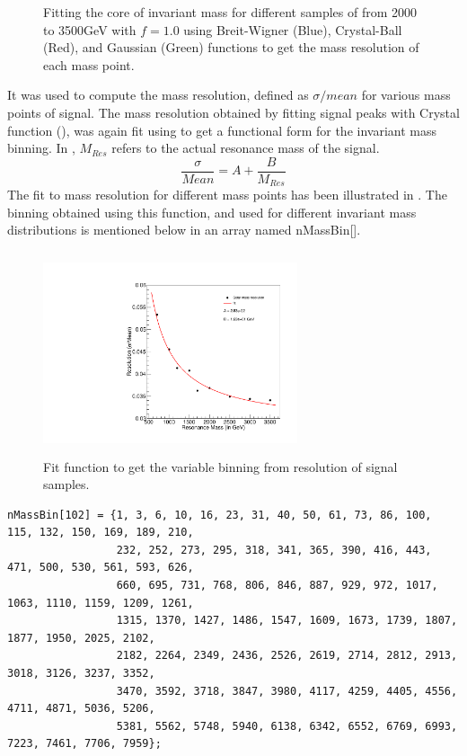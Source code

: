 \begin{figure}[h!]
 \caption{Fitting the core of \qstar invariant mass for different samples of \mqstar from  2000 to 3500\unit{GeV} with $f=1.0$ using Breit-Wigner 
(Blue), Crystal-Ball (Red), and Gaussian (Green) functions to get the mass resolution of each mass point.}
 \label{fig:fitQstarMass1}
\end{figure}
It was used to compute the mass resolution, defined as $\sigma/mean$ for various mass points of \qstar signal. The mass resolution obtained by 
fitting \qstar signal peaks with Crystal function (\eqn{\ref{eq:crystalball}}), was again fit using \eqn{\ref{eqn:massBin}} to get a functional 
form for the invariant mass binning. In \eqn{\ref{eqn:massBin}}, $M_{Res}$ refers to the actual resonance mass of the \qstar signal. 
\begin{equation}
\frac{\sigma}{Mean} = A + \frac{B}{M_{Res}}
\label{eqn:massBin}
\end{equation}
The fit to \qstar mass resolution for different mass points has been illustrated in \fig{\ref{fig:MassResolution}}. The binning obtained using this 
function, and used for different invariant mass distributions is mentioned below in an array named nMassBin[].
\begin{figure}[h!]
\centering
 \includegraphics[width=7.5cm,height=5.95cm]{ch5/plots/Fitting/Fit_SigmaMean_v1.pdf}
 \caption{Fit function to get the variable binning from resolution of signal samples.}
 \label{fig:MassResolution}
\end{figure}
{\scriptsize
\begin{verbatim}
nMassBin[102] = {1, 3, 6, 10, 16, 23, 31, 40, 50, 61, 73, 86, 100, 115, 132, 150, 169, 189, 210,
                 232, 252, 273, 295, 318, 341, 365, 390, 416, 443, 471, 500, 530, 561, 593, 626,
                 660, 695, 731, 768, 806, 846, 887, 929, 972, 1017, 1063, 1110, 1159, 1209, 1261,
                 1315, 1370, 1427, 1486, 1547, 1609, 1673, 1739, 1807, 1877, 1950, 2025, 2102, 
                 2182, 2264, 2349, 2436, 2526, 2619, 2714, 2812, 2913, 3018, 3126, 3237, 3352, 
                 3470, 3592, 3718, 3847, 3980, 4117, 4259, 4405, 4556, 4711, 4871, 5036, 5206, 
                 5381, 5562, 5748, 5940, 6138, 6342, 6552, 6769, 6993, 7223, 7461, 7706, 7959};
\end{verbatim}
}

